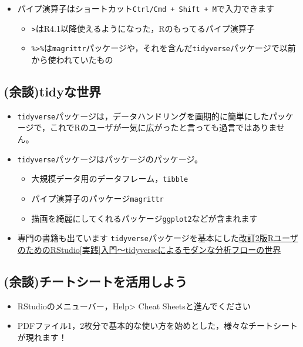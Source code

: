 \documentclass[
  a4paper,
]{ltjsbook}
\providecommand{\tightlist}{%
  \setlength{\itemsep}{0pt}\setlength{\parskip}{0pt}}\usepackage{longtable,booktabs,array}
\begin{document}
\begin{itemize}
\tightlist
\item
  パイプ演算子はショートカット\texttt{Ctrl/Cmd\ +\ Shift\ +\ M}で入力できます

  \begin{itemize}
  \tightlist
  \item
    \texttt{\textbar{}\textgreater{}}はR4.1以降使えるようになった，Rのもってるパイプ演算子
  \item
    \texttt{\%\textgreater{}\%}は\texttt{magrittr}パッケージや，それを含んだ\texttt{tidyverse}パッケージで以前から使われていたもの
  \end{itemize}
\end{itemize}

\subsection{(余談)tidyな世界}\label{ux4f59ux8ac7tidyux306aux4e16ux754c}

\begin{itemize}
\tightlist
\item
  \texttt{tidyverse}パッケージは，データハンドリングを画期的に簡単にしたパッケージで，これでRのユーザが一気に広がったと言っても過言ではありません。
\item
  \texttt{tidyverse}パッケージはパッケージのパッケージ。

  \begin{itemize}
  \tightlist
  \item
    大規模データ用のデータフレーム，\texttt{tibble}
  \item
    パイプ演算子のパッケージ\texttt{magrittr}
  \item
    描画を綺麗にしてくれるパッケージ\texttt{ggplot2}などが含まれます
  \end{itemize}
\item
  専門の書籍も出ています
  \texttt{tidyverse}パッケージを基本にした\href{https://amzn.to/4bisTkc}{改訂2版RユーザのためのRStudio{[}実践{]}入門〜tidyverseによるモダンな分析フローの世界}
\end{itemize}

\subsection{(余談)チートシートを活用しよう}\label{ux4f59ux8ac7ux30c1ux30fcux30c8ux30b7ux30fcux30c8ux3092ux6d3bux7528ux3057ux3088ux3046}

\begin{itemize}
\tightlist
\item
  RStudioのメニューバー，Help\textgreater{} Cheat Sheetsと進んでください
\item
  PDFファイル1，2枚分で基本的な使い方を始めとした，様々なチートシートが現れます！
\end{itemize}
\end{document}
